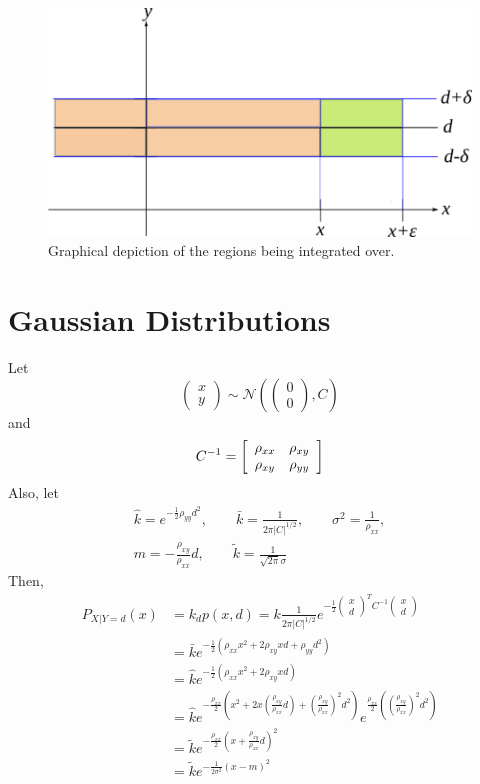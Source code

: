 \begin{figure}[ht!]
\centering
\includegraphics[width=.5\textwidth]{images/03deltaSpace}
\caption{Graphical depiction of the regions being integrated over.}
\label{fig:03deltaSpace}
\end{figure}

\section{Gaussian Distributions}
Let
$$\left(\begin{array}{c}x \\y\end{array}\right) \sim\mathcal{N}\left(\left(\begin{array}{c}0\\0\end{array}\right), C\right)$$
and
$$C^{-1} = \left[\begin{array}{c c} \rho_{xx} & \rho_{xy} \\ \rho_{xy} & \rho_{yy} \end{array}\right]$$
Also, let
\begin{align*}
\hat{k}=e^{-\frac{1}{2}\rho_{yy}d^2}, \qquad \bar{k}=\frac{1}{2\pi|C|^{1/2}},\qquad \sigma^2=\frac{1}{\rho_{xx}}, \\ m=-\frac{\rho_{xy}}{\rho_{xx}}d, \qquad \tilde{k}=\frac{1}{\sqrt{2\pi}\sigma}
\end{align*}
Then,
\begin{align*}
P_{X|Y=d}(x) &= k_d p(x,d) = k\frac{1}{2\pi|C|^{1/2}} e^{-\frac{1}{2}\left(\begin{array}{c}x\\d\end{array}\right)^T C^{-1} \left(\begin{array}{c}x\\d\end{array}\right)} \\
&= \bar{k}e^{-\frac{1}{2}\left(\rho_{xx}x^2+2\rho_{xy}xd+\rho_{yy}d^2\right)} \\
&= \hat{k}e^{-\frac{1}{2}\left(\rho_{xx}x^2+2\rho_{xy}xd\right)} \\
&= \hat{k}e^{-\frac{\rho_{xx}}{2}\left(x^2 + 2x(\frac{\rho_{xy}}{\rho_{xx}}d) + {(\frac{\rho_{xy}}{\rho_{xx}})}^2 d^2\right)} e^{\frac{\rho_{xx}}{2}\left({(\frac{\rho_{xy}}{\rho_{xx}})}^2 d^2\right)} \\
&= \tilde{k}e^{-\frac{\rho_{xx}}{2}{\left(x+\frac{\rho_{xy}}{\rho_{xx}}d\right)}^2} \\
&= \tilde{k}e^{-\frac{1}{2\sigma^2}{\left(x-m\right)}^2}
\end{align*}

